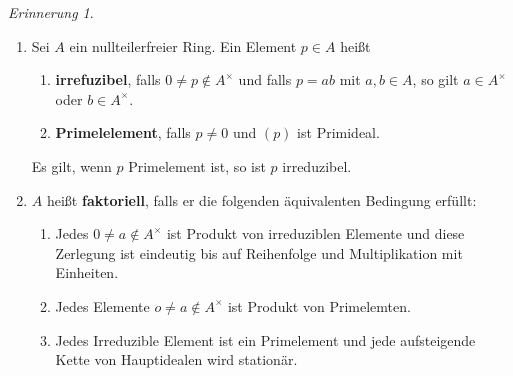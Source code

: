 \documentclass[10pt,a4paper]{article}
\newcounter{thm}[section]
\theoremstyle{definition}
\theoremstyle{plain}
\theoremstyle{remark}
\newtheorem{rem}[thm]{Erinnerung}
\begin{document}
\begin{rem}\label{701rem}
\begin{enumerate}
	\item Sei $A$ ein nullteilerfreier Ring. Ein Element $p\in A$ heißt
		\begin{enumerate}
			\item \textbf{irrefuzibel}, falls $0\neq p\notin A^\times$ und falls $p=ab$ mit $a,b\in A$, so gilt $a\in A^\times$ oder $b\in A^\times$.
			\item \textbf{Primelelement}, falls $p\neq 0$ und $(p)$ ist Primideal.\\
		\end{enumerate}
		Es gilt, wenn $p$ Primelement ist, so ist $p$ irreduzibel.
	\item $A$ heißt \textbf{faktoriell}, falls er die folgenden äquivalenten Bedingung erfüllt:
	\begin{enumerate}
		\item Jedes $0\neq a\notin A^\times$ ist Produkt von irreduziblen Elemente und diese Zerlegung ist eindeutig bis auf Reihenfolge und Multiplikation mit Einheiten.
		\item Jedes Elemente $o\neq a\notin A^\times$ ist Produkt von Primelemten.
		\item Jedes Irreduzible Element ist ein Primelement und jede aufsteigende Kette von Hauptidealen wird stationär.
	\end{enumerate} 
\end{enumerate}
\end{rem}
\end{document}
